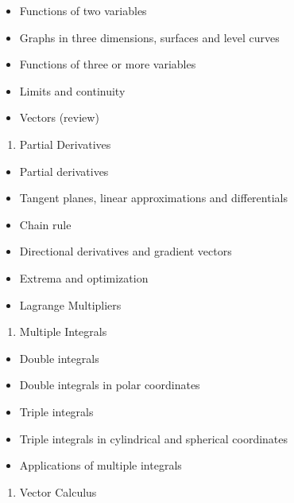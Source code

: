 \documentclass[
]{article}
\providecommand{\tightlist}{%
  \setlength{\itemsep}{0pt}\setlength{\parskip}{0pt}}
\begin{document}
\begin{itemize}
\tightlist
\item
  Functions of two variables
\item
  Graphs in three dimensions, surfaces and level curves
\item
  Functions of three or more variables
\item
  Limits and continuity
\item
  Vectors (review)
\end{itemize}

\begin{enumerate}
\def\labelenumi{\arabic{enumi}.}
\setcounter{enumi}{1}
\tightlist
\item
  Partial Derivatives
\end{enumerate}

\begin{itemize}
\tightlist
\item
  Partial derivatives
\item
  Tangent planes, linear approximations and differentials
\item
  Chain rule
\item
  Directional derivatives and gradient vectors
\item
  Extrema and optimization
\item
  Lagrange Multipliers
\end{itemize}

\begin{enumerate}
\def\labelenumi{\arabic{enumi}.}
\setcounter{enumi}{2}
\tightlist
\item
  Multiple Integrals
\end{enumerate}

\begin{itemize}
\tightlist
\item
  Double integrals
\item
  Double integrals in polar coordinates
\item
  Triple integrals
\item
  Triple integrals in cylindrical and spherical coordinates
\item
  Applications of multiple integrals
\end{itemize}

\begin{enumerate}
\def\labelenumi{\arabic{enumi}.}
\setcounter{enumi}{3}
\tightlist
\item
  Vector Calculus
\end{enumerate}
\end{document}
